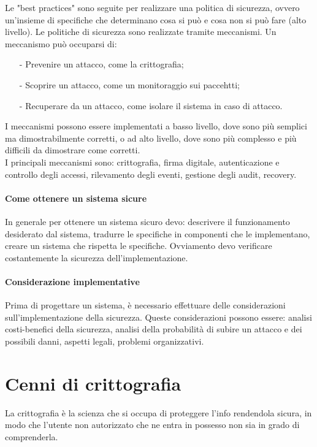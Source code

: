 \documentclass[a4paper, 10pt]{report}
\begin{document}
\begin{itemize}
\noindent Le "best practices" sono seguite per realizzare una politica di sicurezza, ovvero un'insieme di specifiche che determinano cosa si può e cosa non si può fare (alto livello). Le politiche di sicurezza sono realizzate tramite meccanismi. Un meccanismo può occuparsi di:
\begin{itemize}
\item[-] Prevenire un attacco, come la crittografia;
\item[-] Scoprire un attacco, come un monitoraggio sui paccehtti;
\item[-] Recuperare da un attacco, come isolare il sistema in caso di attacco.
\end{itemize} 

\noindent I meccanismi possono essere implementati a basso livello, dove sono più semplici ma dimostrabilmente corretti, o ad alto livello, dove sono più complesso e più difficili da dimostrare come corretti. 
\\
\noindent I principali meccanismi sono: crittografia, firma digitale, autenticazione e controllo degli accessi, rilevamento degli eventi, gestione degli audit, recovery. 
\end{itemize}

\paragraph*{Come ottenere un sistema sicure} In generale per ottenere un sistema sicuro devo: descrivere il funzionamento desiderato dal sistema, tradurre le specifiche in componenti che le implementano, creare un sistema che rispetta le specifiche. Ovviamento devo verificare costantemente la sicurezza dell'implementazione.

\paragraph*{Considerazione implementative} Prima di progettare un sistema, è necessario effettuare delle considerazioni sull'implementazione della sicurezza. Queste considerazioni possono essere: analisi costi-benefici della sicurezza, analisi della probabilità di subire un attacco e dei possibili danni, aspetti legali, problemi organizzativi.

\section{Cenni di crittografia}

La crittografia è la scienza che si occupa di proteggere l'info rendendola sicura, in modo che l'utente non autorizzato che ne entra in possesso non sia in grado di comprenderla.
\end{document}
